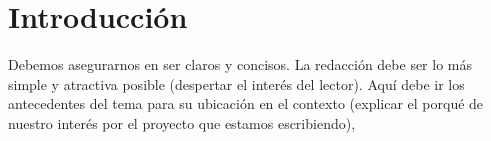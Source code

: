 \section{Introducción}
Debemos asegurarnos en ser claros y concisos. La redacción debe ser lo más simple y atractiva posible (despertar el interés del lector). 
Aquí debe ir los antecedentes del tema para su ubicación en el contexto (explicar el porqué de nuestro interés por el proyecto que estamos escribiendo), 

